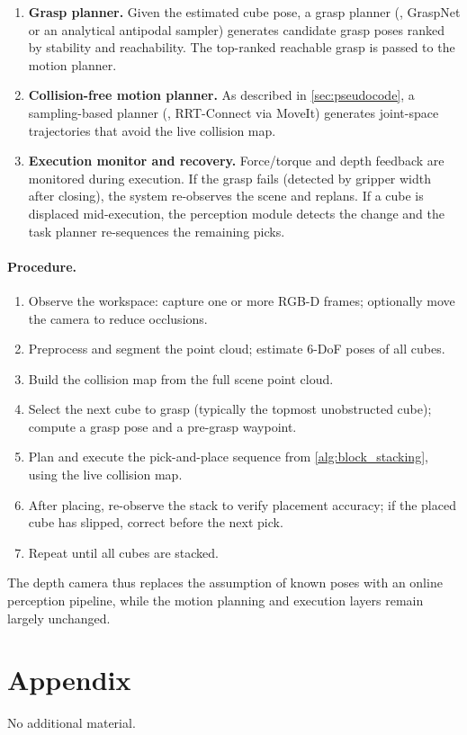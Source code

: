 \documentclass{article}
\begin{document}
\begin{enumerate}[leftmargin=*,noitemsep,topsep=0pt]
  \item \textbf{Grasp planner.}
        Given the estimated cube pose, a grasp planner (\eg, GraspNet or an analytical antipodal sampler) generates candidate grasp poses ranked by stability and reachability.
        The top-ranked reachable grasp is passed to the motion planner.

  \item \textbf{Collision-free motion planner.}
        As described in \cref{sec:pseudocode}, a sampling-based planner (\eg, RRT-Connect via MoveIt) generates joint-space trajectories that avoid the live collision map.

  \item \textbf{Execution monitor and recovery.}
        Force/torque and depth feedback are monitored during execution.
        If the grasp fails (detected by gripper width after closing), the system re-observes the scene and replans.
        If a cube is displaced mid-execution, the perception module detects the change and the task planner re-sequences the remaining picks.
\end{enumerate}

\paragraph{Procedure.}
\begin{enumerate}[leftmargin=*,noitemsep,topsep=0pt]
  \item Observe the workspace: capture one or more RGB-D frames; optionally move the camera to reduce occlusions.
  \item Preprocess and segment the point cloud; estimate 6-DoF poses of all cubes.
  \item Build the collision map from the full scene point cloud.
  \item Select the next cube to grasp (typically the topmost unobstructed cube); compute a grasp pose and a pre-grasp waypoint.
  \item Plan and execute the pick-and-place sequence from \cref{alg:block_stacking}, using the live collision map.
  \item After placing, re-observe the stack to verify placement accuracy; if the placed cube has slipped, correct before the next pick.
  \item Repeat until all cubes are stacked.
\end{enumerate}

\noindent The depth camera thus replaces the assumption of known poses with an online perception pipeline, while the motion planning and execution layers remain largely unchanged.




\appendix

\section{Appendix}

No additional material.
\end{document}
